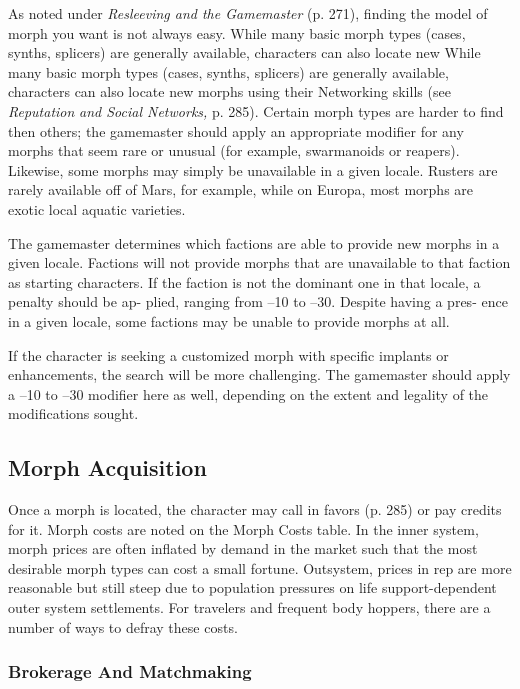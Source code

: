 As noted under \textit{Resleeving and the Gamemaster} (p. 271), 
finding the model of morph you want is not always easy. 
While many basic morph types (cases, synths, splicers) 
are generally available, characters can also locate new 
While many basic morph types (cases, synths, splicers)
are generally available, characters can also locate new 
morphs using their Networking skills (see \textit{Reputation }
\textit{and Social Networks,} p. 285). Certain morph types 
are harder to find then others; the gamemaster should 
apply an appropriate modifier for any morphs that seem 
rare or unusual (for example, swarmanoids or reapers). 
Likewise, some morphs may simply be unavailable in a 
given locale. Rusters are rarely available off of Mars, for 
example, while on Europa, most morphs are exotic local 
aquatic varieties.

The gamemaster determines which factions are able 
to provide new morphs in a given locale. Factions 
will not provide morphs that are unavailable to that 
faction as starting characters. If the faction is not the 
dominant one in that locale, a penalty should be ap-
plied, ranging from –10 to –30. Despite having a pres-
ence in a given locale, some factions may be unable to 
provide morphs at all.

If the character is seeking a customized morph with 
specific implants or enhancements, the search will be 
more challenging. The gamemaster should apply a –10 
to –30 modifier here as well, depending on the extent 
and legality of the modifications sought.

\subsection{Morph Acquisition}

Once a morph is located, the character may call in 
favors (p. 285) or pay credits for it. Morph costs are 
noted on the Morph Costs table. In the inner system, 
morph prices are often inflated by demand in the 
market such that the most desirable morph types can 
cost a small fortune. Outsystem, prices in rep are more 
reasonable but still steep due to population pressures 
on life support-dependent outer system settlements. 
For travelers and frequent body hoppers, there are a 
number of ways to defray these costs.

\subsubsection{Brokerage And Matchmaking}

